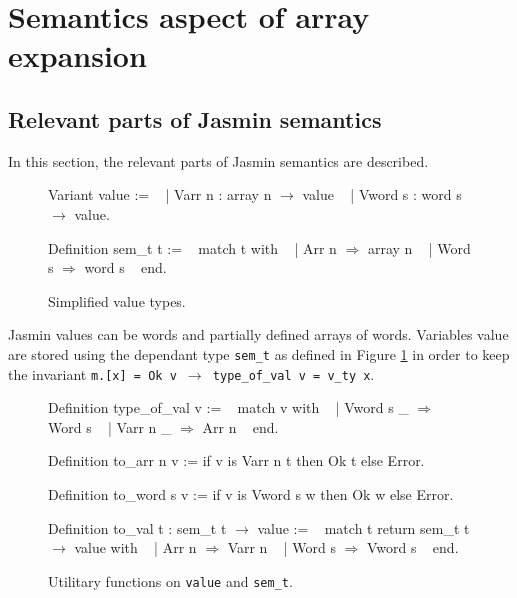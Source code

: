 \documentclass{article}
\begin{document}
\section{Semantics aspect of array expansion}\label{sec:semantics}

\subsection{Relevant parts of Jasmin semantics}

In this section, the relevant parts of Jasmin semantics are described.

\begin{figure}
\obeylines\obeyspaces\ttfamily%
Variant value :=
~ | Varr  n : array n \(\rightarrow\) value
~ | Vword s : word  s \(\rightarrow\) value.

Definition sem\_t t :=
~ match t with
~ | Arr  n \(\Rightarrow\) array n
~ | Word s \(\Rightarrow\) word  s
~ end.
\normalfont%
\caption{Simplified value types.}\label{fig:val}
\end{figure}

Jasmin values can be words and partially defined arrays of words. Variables value
are stored using the dependant type \texttt{sem\_t} as defined in Figure
\ref{fig:val} in order to keep the invariant
\texttt{m.[x] = Ok v \(\rightarrow\) type\_of\_val v = v\_ty x}.

\begin{figure}
\obeylines\obeyspaces\ttfamily%
Definition type\_of\_val v :=
~ match v with
~ | Vword s \_ \(\Rightarrow\) Word s
~ | Varr  n \_ \(\Rightarrow\) Arr  n
~ end.

Definition to\_arr  n v := if v is Varr  n t then Ok t else Error.

Definition to\_word s v := if v is Vword s w then Ok w else Error.

Definition to\_val t : sem\_t t \(\rightarrow\) value :=
~ match t return sem\_t t \(\rightarrow\) value with
~ | Arr  n \(\Rightarrow\) Varr  n
~ | Word s \(\Rightarrow\) Vword s
~ end.
\normalfont%
\caption{Utilitary functions on \texttt{value} and \texttt{sem\_t}.}
\end{figure}

\medskip
\end{document}

